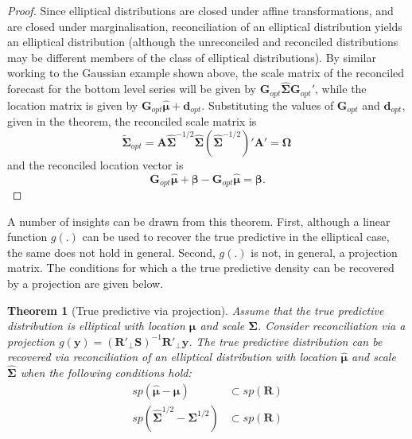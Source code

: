 \documentclass[12pt]{article}
\newtheorem{theo}{Theorem}[section]
\theoremstyle{definition}
\begin{document}
\begin{proof}
	Since elliptical distributions are closed under affine transformations, and are closed under marginalisation, reconciliation of an elliptical distribution yields an elliptical distribution (although the unreconciled and reconciled distributions may be different members of the class of elliptical distributions). By similar working to the Gaussian example shown above, the scale matrix of the reconciled forecast for the bottom level series will be given by $\bm{G}_{opt}\hat{\bm{\Sigma}}\bm{G}_{opt}'$, while the location matrix is given by $\bm{G}_{opt}\hat{\bm{\mu}}+\bm{d}_{opt}$. Substituting the values of $\bm{G}_{opt}$ and $\bm{d}_{opt}$, given in the theorem, the reconciled scale matrix is
	\[
	\tilde{\bm{\Sigma}}_{opt}
	= {\bm{A}}\hat{\bm\Sigma}^{-1/2}\hat{\bm{\Sigma}}\left(\hat{\bm\Sigma}^{-1/2}\right)'{\bm{A}}'
	= \bm{\Omega}\,
	\]
    and the reconciled location vector is
	\[
	\bm{G}_{opt}\hat{\bm{\mu}}+\bm{\beta}-\bm{G}_{opt}\hat{\bm{\mu}}
	= \bm{\beta}.
	\]
\end{proof}

A number of insights can be drawn from this theorem. First, although a linear function $g(.)$ can be used to recover the true predictive in the elliptical case, the same does not hold in general. Second, $g(.)$ is not, in general, a projection matrix. The conditions for which a the true predictive density can be recovered by a projection are given below.

\begin{theo}[True predictive via projection]
	Assume that the true predictive distribution is elliptical with location $\bm{\mu}$ and scale $\bm{\Sigma}$. Consider reconciliation via a projection $g(\bm{y})=(\bm{R}'_{\perp}\bm{S})^{-1}\bm{R}'_{\perp}\bm{y}$. The true predictive distribution can be recovered via reconciliation of an elliptical distribution with location $\hat{\bm{\mu}}$ and scale $\hat{\bm{\Sigma}}$ when the following conditions hold:
	\begin{align}
		sp(\hat{\bm\mu}-\bm{\mu})&\subset sp(\bm{R})\\
		sp(\hat{\bm{\Sigma}}^{1/2}-\bm{\Sigma}^{1/2})&\subset sp(\bm{R})\\
	\end{align}
\end{theo}
\end{document}
